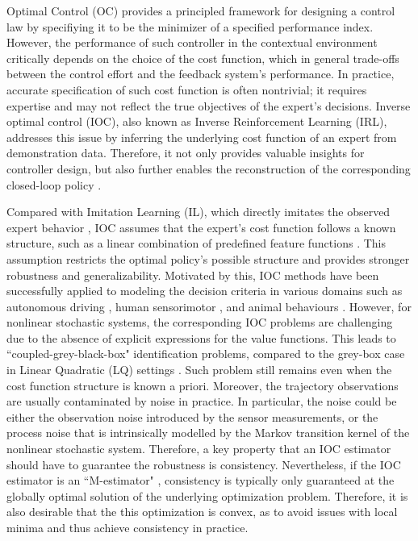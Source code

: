 


Optimal Control (OC) provides a principled framework for designing a control law by specifiying it to be the minimizer of a specified performance index. 
However, the performance of such controller in the contextual environment critically depends on the choice of the cost function, which in general trade-offs between the control effort and the feedback system's performance. In practice, accurate specification of such cost function is often nontrivial; it requires expertise and may not reflect the true objectives of the expert's decisions.
Inverse optimal control (IOC), also known as Inverse Reinforcement Learning (IRL), addresses this issue by inferring the underlying cost function of an expert from demonstration data. 
Therefore, it not only provides valuable insights for controller design, but also further enables the reconstruction of the corresponding closed-loop policy \citep{dey2023inverse, mombaur2010human}.


Compared with Imitation Learning (IL), which directly imitates the observed expert behavior \citep{zare2024survey}, IOC assumes that the expert's cost function follows a known structure, such as a linear combination of predefined feature functions \citep{ziebart2008maximum,zhang2019inverse,garrabe2025convex}.
This assumption restricts the optimal policy's possible structure and provides stronger robustness and generalizability.
Motivated by this, IOC methods have been successfully applied to modeling the decision criteria in various domains such as autonomous driving \citep{likmeta2021dealing}, human sensorimotor \citep{Schultheis2021Inverse}, and animal behaviours \citep{Ashwood2022Dynamic}.
However, for nonlinear stochastic systems, the corresponding IOC problems are challenging due to the absence of explicit expressions for the value functions.
This leads to ``coupled-grey-black-box" identification problems, compared to the grey-box case in Linear Quadratic (LQ) settings \citep{zhang2019inverse,zhang2019inverseCDC,li2018convex,zhang2021inverse,zhang2022statistically,yu2021system, Menner2018Convex, rickenbach2024inverse, guo2023imitation, zhang2024statistically, zhang2024inverse}.
Such problem still remains even when the cost function structure is known a priori. 
Moreover, the trajectory observations are usually contaminated by noise in practice. In particular, the noise could be either the observation noise introduced by the sensor measurements, or the process noise that is intrinsically modelled by the Markov transition kernel of the nonlinear stochastic system.
Therefore,  a key property that an IOC estimator should have to guarantee the robustness is consistency.
Nevertheless, if the IOC estimator is an ``M-estimator" \citep[Chap.~5]{van1998asymptotic}, consistency is typically only guaranteed at the globally optimal solution of the underlying optimization problem. Therefore,  it is also desirable that the this optimization is convex, as to avoid issues with local minima and thus achieve consistency in practice.


